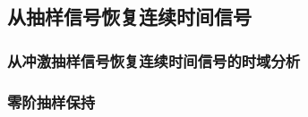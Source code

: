 \subsection{从抽样信号恢复连续时间信号} \label{5 从抽样信号恢复连续时间信号}
\subsubsection{从冲激抽样信号恢复连续时间信号的时域分析}

\subsubsection{零阶抽样保持}
